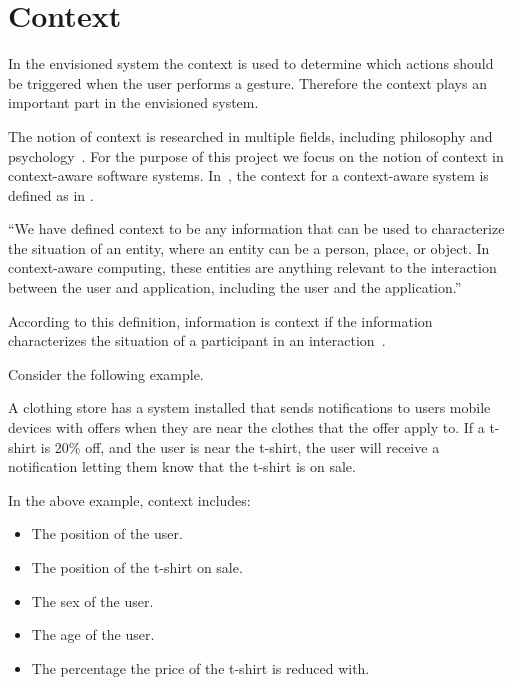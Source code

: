 \section{Context}
\label{sec:analysis:context}

In the envisioned system the context is used to determine which actions should be triggered when the user performs a gesture. Therefore the context plays an important part in the envisioned system.

The notion of context is researched in multiple fields, including philosophy and psychology~\cite{bolchini2007data}. For the purpose of this project we focus on the notion of context in context-aware software systems. In~\cite{abowd1999towards}, the context for a context-aware system is defined as in .

\begin{definition}
``We have defined context to be any information that can be used to characterize the situation  of  an  entity,  where  an entity  can  be  a  person,  place,  or  object.  In  context-aware  computing,  these  entities  are  anything  relevant  to  the  interaction  between  the user and application, including the user and the application.''~\cite{abowd1999towards}
\label{def:context}
\end{definition}

According to this definition, information is context if the information characterizes the situation of a participant in an interaction~\cite{abowd1999towards}.

Consider the following example.

\begin{testexample}
A clothing store has a system installed that sends notifications to users mobile devices with offers when they are near the clothes that the offer apply to. If a t-shirt is 20\% off, and the user is near the t-shirt, the user will receive a notification letting them know that the t-shirt is on sale.
\end{testexample}

In the above example, context includes:

\begin{itemize}
\item The position of the user.
\item The position of the t-shirt on sale.
\item The sex of the user.
\item The age of the user.
\item The percentage the price of the t-shirt is reduced with.
\end{itemize}

